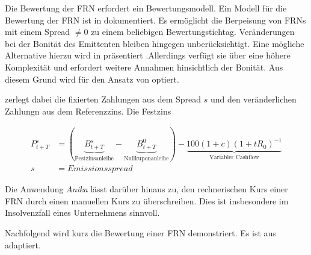 \documentclass[12pt, a4paper]{article}
\theoremstyle{plain}
\begin{document}


Die Bewertung der \gls{FRN} erfordert ein Bewertungsmodell. Ein Modell für die Bewertung der \gls{FRN} ist in \textcite[][S.~31~f.]{alexander_market_2008} dokumentiert. 
Es ermöglicht die Berpeisung von \glspl{FRN} mit einem Spread $\neq0$ zu einem beliebigen Bewertungstichtag.
Veränderungen bei der Bonität des Emittenten bleiben hingegen unberücksichtigt. 
Eine mögliche Alternative hierzu wird in \textcite[][S.~65~f.]{schonbucher_credit_2003} präsentiert .Allerdings verfügt sie über eine höhere Komplexität und erfordert weitere Annahmen hinsichtlich der Bonität. Aus diesem Grund wird für den Ansatz von \autocite[][S.~31~f.]{alexander_market_2008} optiert.

\textcite[][]{alexander_market_2008} zerlegt dabei die fixierten Zahlungen aus dem Spread $s$ und den veränderlichen Zahlungn aus dem Referenzzins. Die Festzins

\begin{align*}
	P_{t+T}^{s}&=(\underbrace{B_{t+T}^{s}}_\text{Festzinsanleihe}-\underbrace{B_{t+T}^{0}}_\text{Nullkuponanleihe})-\underbrace{100(1+c)(1+t R_{0})^{-1}}_\text{Variabler Cashflow}\\
	s&= Emissionsspread
\end{align*}

Die Anwendung \textit{Anika} lässt darüber hinaus zu, den rechnerischen Kurs einer \gls{FRN} durch einen manuellen Kurs zu überschreiben. Dies ist insbesondere im Insolvenzfall eines Unternehmens sinnvoll.

Nachfolgend wird kurz die Bewertung einer \gls{FRN} demonstriert. Es ist aus \textcite[][32]{alexander_market_2008} adaptiert.
\end{document}
